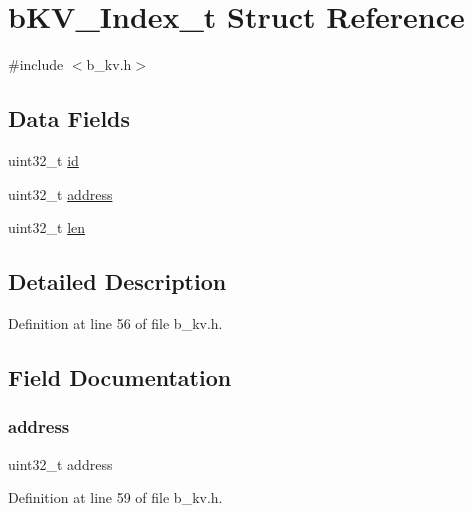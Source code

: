 \hypertarget{structb_k_v___index__t}{}\section{b\+K\+V\+\_\+\+Index\+\_\+t Struct Reference}
\label{structb_k_v___index__t}


{\ttfamily \#include $<$b\+\_\+kv.\+h$>$}

\subsection*{Data Fields}
\begin{DoxyCompactItemize}
\item 
uint32\+\_\+t \mbox{\hyperlink{structb_k_v___index__t_abaabdc509cdaba7df9f56c6c76f3ae19}{id}}
\item 
uint32\+\_\+t \mbox{\hyperlink{structb_k_v___index__t_ac0d31ca829f934cccd89f8054e02773e}{address}}
\item 
uint32\+\_\+t \mbox{\hyperlink{structb_k_v___index__t_a96bbf959016e4411c9e6b9812a8be60a}{len}}
\end{DoxyCompactItemize}


\subsection{Detailed Description}


Definition at line 56 of file b\+\_\+kv.\+h.



\subsection{Field Documentation}
\mbox{\label{structb_k_v___index__t_ac0d31ca829f934cccd89f8054e02773e}} 
\subsubsection{\texorpdfstring{address}{address}}
{\footnotesize\ttfamily uint32\+\_\+t address}



Definition at line 59 of file b\+\_\+kv.\+h.

\mbox{\label{structb_k_v___index__t_abaabdc509cdaba7df9f56c6c76f3ae19}} 
